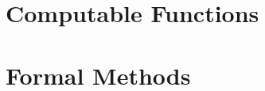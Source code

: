\documentclass[12pt]{article}
\begin{document}
\maketitle
\tableofcontents
\newpage
\section{Computable Functions}

\section{Formal Methods}

\end{document}
